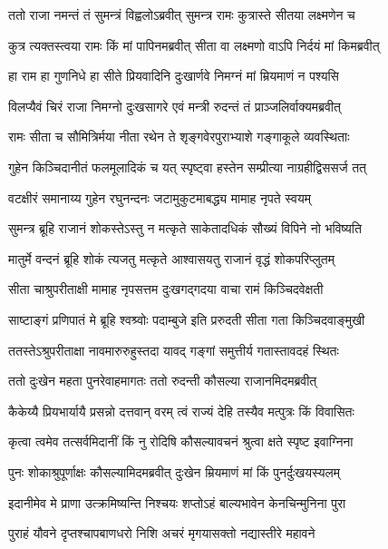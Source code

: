\twolineshloka
{ततो राजा नमन्तं तं सुमन्त्रं विह्वलोऽब्रवीत्}
{सुमन्त्र रामः कुत्रास्ते सीतया लक्ष्मणेन च} %

\twolineshloka
{कुत्र त्यक्तस्त्वया रामः किं मां पापिनमब्रवीत्}
{सीता वा लक्ष्मणो वाऽपि निर्दयं मां किमब्रवीत्} %

\twolineshloka
{हा राम हा गुणनिधे हा सीते प्रियवादिनि}
{दुःखार्णवे निमग्नं मां म्रियमाणं न पश्यसि} %

\twolineshloka
{विलप्यैवं चिरं राजा निमग्नो दुःखसागरे}
{एवं मन्त्री रुदन्तं तं प्राञ्जलिर्वाक्यमब्रवीत्} %

\twolineshloka
{रामः सीता च सौमित्रिर्मया नीता रथेन ते}
{शृङ्गवेरपुराभ्याशे गङ्गाकूले व्यवस्थिताः} %

\twolineshloka
{गुहेन किञ्चिदानीतं फलमूलादिकं च यत्}
{स्पृष्ट्वा हस्तेन सम्प्रीत्या नाग्रहीद्विससर्ज तत्} %

\twolineshloka
{वटक्षीरं समानाय्य गुहेन रघुनन्दनः}
{जटामुकुटमाबद्ध्य मामाह नृपते स्वयम्} %

\twolineshloka
{सुमन्त्र ब्रूहि राजानं शोकस्तेऽस्तु न मत्कृते}
{साकेतादधिकं सौख्यं विपिने नो भविष्यति} %

\twolineshloka
{मातुर्मे वन्दनं ब्रूहि शोकं त्यजतु मत्कृते}
{आश्वासयतु राजानं वृद्धं शोकपरिप्लुतम्} %

\twolineshloka
{सीता चाश्रुपरीताक्षी मामाह नृपसत्तम}
{दुःखगद्गदया वाचा रामं किञ्चिदवेक्षती} %

\twolineshloka
{साष्टाङ्गं प्रणिपातं मे ब्रूहि श्वश्र्वोः पदाम्बुजे}
{इति प्ररुदती सीता गता किञ्चिदवाङ्मुखी} %

\twolineshloka
{ततस्तेऽश्रुपरीताक्षा नावमारुरुहुस्तदा}
{यावद् गङ्गां समुत्तीर्य गतास्तावदहं स्थितः} %

\twolineshloka
{ततो दुःखेन महता पुनरेवाहमागतः}
{ततो रुदन्ती कौसल्या राजानमिदमब्रवीत्} %

\twolineshloka
{कैकेय्यै प्रियभार्यायै प्रसन्नो दत्तवान् वरम्}
{त्वं राज्यं देहि तस्यैव मत्पुत्रः किं विवासितः} %

\twolineshloka
{कृत्वा त्वमेव तत्सर्वमिदानीं किं नु रोदिषि}
{कौसल्यावचनं श्रुत्वा क्षते स्पृष्ट इवाग्निना} %

\twolineshloka
{पुनः शोकाश्रुपूर्णाक्षः कौसल्यामिदमब्रवीत्}
{दुःखेन म्रियमाणं मां किं पुनर्दुःखयस्यलम्} %

\twolineshloka
{इदानीमेव मे प्राणा उत्क्रमिष्यन्ति निश्चयः}
{शप्तोऽहं बाल्यभावेन केनचिन्मुनिना पुरा} %

\twolineshloka
{पुराहं यौवने दृप्तश्चापबाणधरो निशि}
{अचरं मृगयासक्तो नद्यास्तीरे महावने} %


